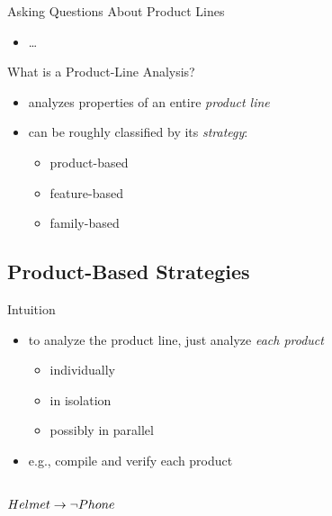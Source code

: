 \begin{frame}{\myframetitle}
\begin{fancycolumns}[t,widths={47}]
\begin{example}{Asking Questions About Product Lines}
\begin{itemize}
				\item \ldots
			\end{itemize}
		\end{example}
		\begin{definition}{What is a Product-Line Analysis?}
			\begin{itemize}
				\item analyzes properties of an entire \emph{product line}
				\item can be roughly classified by its \emph{strategy}:
				\begin{itemize}
					\item product-based
					\item feature-based
					\item family-based
				\end{itemize}
			\end{itemize}
		\end{definition}
	\end{fancycolumns}
\end{frame}

\subsection{Product-Based Strategies} %

\begin{frame}{\myframetitle}
	\begin{fancycolumns}
		\begin{definition}{Intuition}
			\begin{itemize}
				\item to analyze the product line, just analyze \emph{each product}
				\begin{itemize}
					\item individually
					\item in isolation
					\item possibly in parallel
				\end{itemize}
				\item e.g., compile and verify each product
			\end{itemize}
		\end{definition}
		\begin{exampletight}{}
			\centering\featureDiagramLego\\$Helmet \rightarrow \neg Phone$
		\end{exampletight}
	\nextcolumn
	\end{fancycolumns}
\end{frame}

